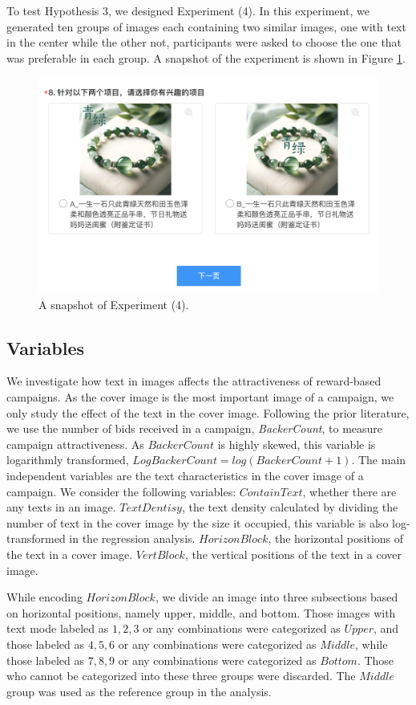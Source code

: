 \documentclass[a4paper]{article}
\begin{document}
To test Hypothesis 3, we designed Experiment (4). In this experiment, we generated ten groups of images each containing two similar images, one with text in the center while the other not, participants were asked to choose the one that was preferable in each group. A snapshot of the experiment is shown in Figure \ref{fig:Experiment6}.

\begin{figure}[h!]
    \centering
    \includegraphics[width=0.8\linewidth]{experiment6.png}
    \caption{A snapshot of Experiment (4).}
    \label{fig:Experiment6}
\end{figure}



\subsection{Variables}
We investigate how text in images affects the attractiveness of reward-based campaigns. As the cover image is the most important image of a campaign, we only study the effect of the text in the cover image. Following the prior literature, we use the number of bids received in a campaign, \emph{BackerCount}, to measure campaign attractiveness. As $BackerCount$ is highly skewed, this variable is logarithmly transformed, $LogBackerCount = log(BackerCount+1)$.  The main independent variables are the text characteristics in the cover image of a campaign. We consider the following variables: $ContainText$, whether there are any texts in an image. $TextDentisy$, the text density calculated by dividing the number of text in the cover image by the size it occupied, this variable is also log-transformed in the regression analysis. $HorizonBlock$, the horizontal positions of the text in a cover image.  $VertBlock$, the vertical positions of the text in a cover image. 

While encoding $HorizonBlock$, we divide an image into three subsections based on horizontal positions, namely upper, middle, and bottom. Those images with text mode labeled as $1, 2, 3$ or any combinations were categorized as $Upper$, and those labeled as $4,5,6$ or any combinations were categorized as $Middle$, while those labeled as $7,8,9$ or any combinations were categorized as $Bottom$. Those who cannot be categorized into these three groups were discarded. The $Middle$ group was used as the reference group in the analysis.
\end{document}
